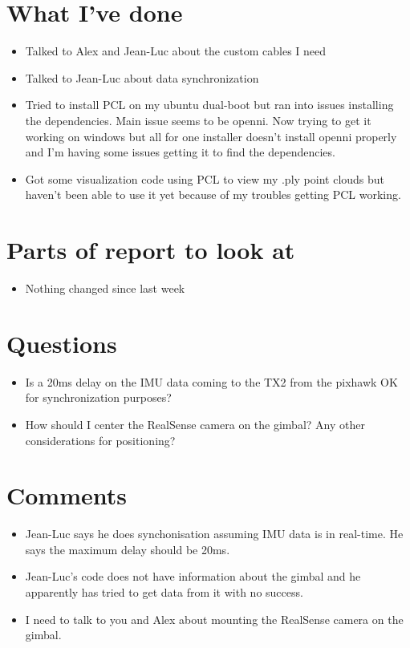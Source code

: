 \documentclass[12pt,a4paper]{article}
\begin{document}
\author{Katrina Ashton}


\pagestyle{fancy}
\fancyhf{}
\rhead{\thepage}

\section{What I've done}
\begin{itemize}
\item{Talked to Alex and Jean-Luc about the custom cables I need}
\item{Talked to Jean-Luc about data synchronization}
\item{Tried to install PCL on my ubuntu dual-boot but ran into issues installing the dependencies. Main issue seems to be openni. Now trying to get it working on windows but all for one installer doesn't install openni properly and I'm having some issues getting it to find the dependencies.}
\item{Got some visualization code using PCL to view my .ply point clouds but haven't been able to use it yet because of my troubles getting PCL working.}
\end{itemize}

\section{Parts of report to look at}
\begin{itemize}
\item{Nothing changed since last week}
\end{itemize}

\section{Questions}
\begin{itemize}
\item{Is a 20ms delay on the IMU data coming to the TX2 from the pixhawk OK for synchronization purposes?}
\item{How should I center the RealSense camera on the gimbal? Any other considerations for positioning?}
\end{itemize}

\section{Comments}
\begin{itemize}
\item{Jean-Luc says he does synchonisation assuming IMU data is in real-time. He says the maximum delay should be 20ms.}
\item{Jean-Luc's code does not have information about the gimbal and he apparently has tried to get data from it with no success.}
\item{I need to talk to you and Alex about mounting the RealSense camera on the gimbal.}
\end{itemize}
\end{document}
